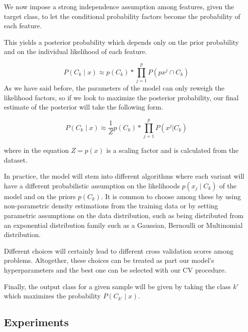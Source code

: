 We now impose a strong independence assumption among features, given the target class, to let the conditional probability factors become the probability of each feature. %

This yields a posterior probability which depends only on the prior probability and on the individual likelihood of each feature.

\begin{equation}\label{eq:posteriorProbabilityDecomposition2}
P(C_k \mid x) \approx p(C_k) * \prod_{j=1}^{p}  P({p} x^j \cap C_k)
\end{equation}
As we have said before, the parameters of the model can only reweigh the likelihood factors, so if we look to maximize the posterior probability, our final estimate of the posterior will take the following form.

\begin{equation}\label{eq:posteriorProbabilityDecomposition3}
P(C_k \mid x) \approx \frac{1}{Z} p(C_k) * \prod_{j=1}^{p}  P(x^j | C_k)
\end{equation}

where in the equation $Z = p(x)$ is a scaling factor and is calculated from the dataset.

In practice, the model will stem into different algorithms where each variant will have a different probabilistic assumption on the likelihoods $p(x_j \mid C_k)$ of the model and on the priors $p(C_k)$.
It is common to choose among these by  using non-parametric density estimations from the training data or by setting parametric assumptions on the data distribution, such as being distributed from an exponential distribution family such as a Gaussian, Bernoulli or Multinomial distribution.

Different choices will certainly lead to different cross validation scores among problems.
Altogether, these choices can be treated as part our model's hyperparameters and the best one can be selected with our CV procedure.

Finally, the output class for a given sample will be given by taking the class $k'$ which maximizes the probability $P(C_{k'} \mid x)$.

\subsection{Experiments}\label{subsection:naive_bayes_experiments}

